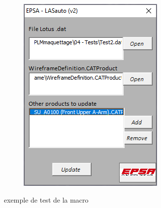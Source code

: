 \begin{figure}
\begin{subfigure}{.3\textwidth}
        \includegraphics[width=\textwidth]{img/maj_screen.png}
    \end{subfigure}{}
    \caption{exemple de test de la macro}
    \label{fig:maj_assy}
\end{figure}